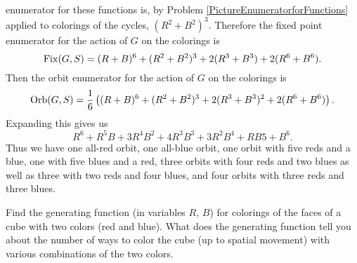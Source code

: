 {enumerator for these functions is, by Problem
\ref{PictureEnumeratorforFunctions} applied to colorings of the cycles,
$(R^2+B^2)^3$.  Therefore the fixed point enumerator for the action of $G$ on the
colorings is
$${\rm Fix}(G,S)= (R+B)^6 +(R^2+B^2)^3 +2(R^3+B^3) + 2(R^6+B^6).$$  Then the orbit
enumerator for the action of $G$ on the colorings is
$${\rm Orb}(G,S)={1\over 6}\left((R+B)^6 +(R^2+B^2)^3 +2(R^3+B^3)^2 +
2(R^6+B^6)\right).$$  Expanding this gives us
$$R^6+R^5B+3R^4B^2+4R^3B^3+3R^2B^4+RB5+B^6.$$  Thus we have one all-red orbit, one
all-blue orbit, one orbit with five reds and a blue, one with five blues and a red,
three orbits with four reds and two blues as well as three with two reds and four
blues, and four orbits with three reds and three blues.}

\item   Find the generating function (in variables $R$, $B$) for colorings of
the
faces of a cube with two colors (red and blue).\label{polya2}  What does the
generating function tell you about the number of ways to color the cube (up to
spatial movement) with various combinations of the two colors.
